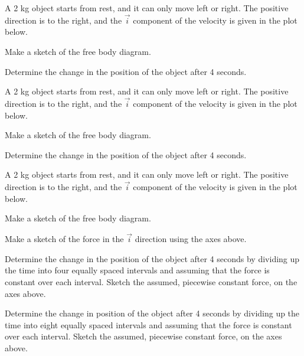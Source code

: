 \begin{problem}
\item A 2 kg object starts from rest, and it can only move left or
  right. The positive direction is to the right, and the $\vec{i}$
  component of the velocity is given in the plot below.

  \scalebox{0.5}{}

  \begin{subproblem}
    \item Make a sketch of the free body diagram.
      \vspace{4em}
    \item Determine the change in the position of the object after 4
      seconds.
      \vfill
  \end{subproblem}
  \clearpage

\item A 2 kg object starts from rest, and it can only move left or
  right. The positive direction is to the right, and the $\vec{i}$
  component of the velocity is given in the plot below.

  \scalebox{0.5}{}

  \begin{subproblem}
    \item Make a sketch of the free body diagram.
      \vspace{4em}
    \item Determine the change in the position of the object after 4
      seconds.
      \vfill
  \end{subproblem}
  \clearpage

\item A 2 kg object starts from rest, and it can only move left or
  right. The positive direction is to the right, and the $\vec{i}$
  component of the velocity is given in the plot below.

  \scalebox{0.5}{}

  \begin{subproblem}
    \item Make a sketch of the free body diagram.
      \vspace{4em}
    \item Make a sketch of the force in the $\vec{i}$ direction using
      the axes above.
    \item Determine the change in the position of the object after 4
      seconds by dividing up the time into four equally spaced
      intervals and assuming that the force is constant over each
      interval. Sketch the assumed, piecewise constant force, on the
      axes above.  
      \vfill
    \item Determine the change in position of the object after 4
      seconds by dividing up the time into eight equally spaced
      intervals and assuming that the force is constant over each
      interval. Sketch the assumed, piecewise constant force, on the
      axes above.
      \vfill
  \end{subproblem}
  \clearpage

\end{problem}

